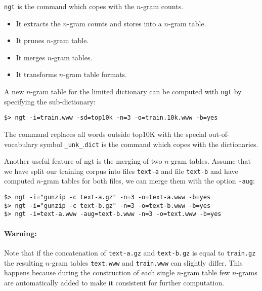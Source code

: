 {\tt ngt} is the command which copes with the $n$-gram counts.


\begin{itemize}
\item It extracts the $n$-gram counts and stores into a $n$-gram table.
\item It prunes $n$-gram table.
\item It merges $n$-gram tables.
\item It transforms $n$-gram table formats.
\end{itemize}

\noindent
A new  $n$-gram table for the  limited dictionary can  be computed with {\tt ngt} by specifying 
the sub-dictionary:
\begin{verbatim}
$> ngt -i=train.www -sd=top10k -n=3 -o=train.10k.www -b=yes
\end{verbatim}
The command replaces  all words outside  top10K with  the special
out-of-vocabulary symbol {\tt \_unk\_}.{\tt dict} is the command which copes with the dictionaries.

\noindent
Another useful feature of ngt is the merging of two $n$-gram tables. Assume that we have 
split our training corpus into files  {\tt text-a} and file {\tt text-b} and have computed $n$-gram 
tables for both files, we can merge them with the option {\tt -aug}:
\begin{verbatim}
$> ngt -i="gunzip -c text-a.gz" -n=3 -o=text-a.www -b=yes
$> ngt -i="gunzip -c text-b.gz" -n=3 -o=text-b.www -b=yes
$> ngt -i=text-a.www -aug=text-b.www -n=3 -o=text.www -b=yes
\end{verbatim}

\paragraph{Warning:} Note that if the concatenation of {\tt text-a.gz} and {\tt text-b.gz} is equal to {\tt train.gz} the resulting $n$-gram tables
{\tt text.www} and {\tt train.www} can slightly differ. This happens because during the construction of each single $n$-gram table few $n$-grams are automatically added to make it consistent for further computation.


